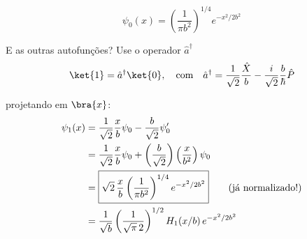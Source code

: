 \begin{equation}
    \boxed{\psi_0(x) = \left( \frac{1}{\pi b^2} \right)^{1/4} e^{-x^2/2b^2}}
\label{eq:aula18_psi0}
\end{equation}

E as outras autofunções? Use o operador $\hat{a}^\dagger$
\begin{equation}
    \ket{1} = \hat{a}^\dagger\ket{0}, \quad \text{com} \quad \hat{a}^\dagger = \frac{1}{\sqrt{2}}\frac{\hat{X}}{b} - \frac{i}{\sqrt{2}}\frac{b}{\hbar}\hat{P}
\label{eq:aula18_ket1}
\end{equation}

projetando em $\bra{x}$:
\begin{align}
    \psi_1(x) &= \frac{1}{\sqrt{2}}\frac{x}{b}\psi_0 - \frac{b}{\sqrt{2}}\psi_0' \notag \\
    &= \frac{1}{\sqrt{2}}\frac{x}{b}\psi_0 + \left( \frac{b}{\sqrt{2}} \right)\left( \frac{x}{b^2} \right)\psi_0 \notag \\
    &= \boxed{\sqrt{2}\,\frac{x}{b}\left( \frac{1}{\pi b^2} \right)^{1/4} e^{-x^2/2b^2}} \qquad \text{(já normalizado!)} \notag \\
    &= \frac{1}{\sqrt{b}}\left( \frac{1}{\sqrt{\pi}\,2} \right)^{1/2} H_1(x/b)\, e^{-x^2/2b^2}
\label{eq:aula18_psi1}
\end{align}
